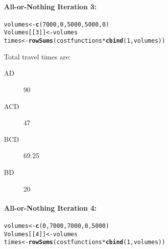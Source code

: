 \documentclass{texMemo}\usepackage[]{graphicx}\usepackage[]{color}
\makeatletter
\newcommand{\hlnum}[1]{\textcolor[rgb]{0.686,0.059,0.569}{#1}}%
\newcommand{\hlopt}[1]{\textcolor[rgb]{0,0,0}{#1}}%
\newcommand{\hlstd}[1]{\textcolor[rgb]{0.345,0.345,0.345}{#1}}%
\newcommand{\hlkwb}[1]{\textcolor[rgb]{0.69,0.353,0.396}{#1}}%
\newcommand{\hlkwd}[1]{\textcolor[rgb]{0.737,0.353,0.396}{\textbf{#1}}}%
\newenvironment{kframe}{%
 \def\at@end@of@kframe{}%
 \ifinner\ifhmode%
  \def\at@end@of@kframe{\end{minipage}}%
  \begin{minipage}{\columnwidth}%
 \fi\fi%
 \def\FrameCommand##1{\hskip\@totalleftmargin \hskip-\fboxsep
 \colorbox{shadecolor}{##1}\hskip-\fboxsep
     \hskip-\linewidth \hskip-\@totalleftmargin \hskip\columnwidth}%
 \MakeFramed {\advance\hsize-\width
   \@totalleftmargin\z@ \linewidth\hsize
   \@setminipage}}%
 {\par\unskip\endMakeFramed%
 \at@end@of@kframe}
\newenvironment{knitrout}{}{} %
\makeatother
\begin{document}
\begin{enumerate}
\paragraph{All-or-Nothing Iteration 3:}
\begin{knitrout}\small
{}\color{fgcolor}\begin{kframe}
\begin{alltt}
\hlstd{volumes} \hlkwb{<-} \hlkwd{c}\hlstd{(}\hlnum{7000}\hlstd{,} \hlnum{0}\hlstd{,} \hlnum{5000}\hlstd{,} \hlnum{5000}\hlstd{,} \hlnum{0}\hlstd{)}
\hlstd{Volumes[[}\hlnum{3}\hlstd{]]} \hlkwb{<-} \hlstd{volumes}
\hlstd{times} \hlkwb{<-} \hlkwd{rowSums}\hlstd{(costfunctions} \hlopt{*} \hlkwd{cbind}\hlstd{(}\hlnum{1}\hlstd{, volumes))}
\end{alltt}
\end{kframe}
\end{knitrout}

\begin{center}
\end{center}

Total travel times are:
\begin{description}
\item[AD]{90}
\item[ACD]{47}
\item[BCD]{69.25}
\item[BD]{20}
\end{description}

\paragraph{All-or-Nothing Iteration 4:}
\begin{knitrout}\small
{}\color{fgcolor}\begin{kframe}
\begin{alltt}
\hlstd{volumes} \hlkwb{<-} \hlkwd{c}\hlstd{(}\hlnum{0}\hlstd{,} \hlnum{7000}\hlstd{,} \hlnum{7000}\hlstd{,} \hlnum{0}\hlstd{,} \hlnum{5000}\hlstd{)}
\hlstd{Volumes[[}\hlnum{4}\hlstd{]]} \hlkwb{<-} \hlstd{volumes}
\hlstd{times} \hlkwb{<-} \hlkwd{rowSums}\hlstd{(costfunctions} \hlopt{*} \hlkwd{cbind}\hlstd{(}\hlnum{1}\hlstd{, volumes))}
\end{alltt}
\end{kframe}
\end{knitrout}


\end{enumerate}
\end{document}
